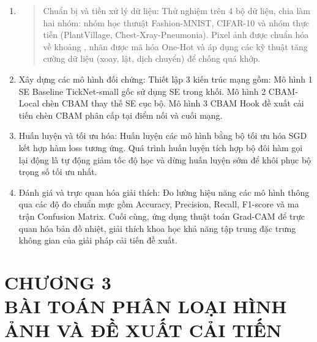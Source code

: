 \documentclass[
]{article}
\begin{document}
\begin{enumerate}
\def\labelenumi{\arabic{enumi}.}
\item
  \begin{quote}
  Chuẩn bị và tiền xử lý dữ liệu: Thử nghiệm trên 4 bộ dữ liệu, chia làm
  hai nhóm: nhóm học thưuật Fashion-MNIST, CIFAR-10 và nhóm thực tiễn
  (PlantVillage, Chest-Xray-Pneumonia). Pixel ảnh được chuẩn hóa về
  khoảng , nhãn được mã hóa One-Hot và áp dụng các kỹ thuật tăng cường
  dữ liệu (xoay, lật, dịch chuyển) để chống quá khớp.
  \end{quote}
\item
  Xây dựng các mô hình đối chứng: Thiết lập 3 kiến trúc mạng gồm: Mô
  hình 1 SE Baseline TickNet-small gốc sử dụng SE trong khối. Mô hình 2
  CBAM-Local chèn CBAM thay thế SE cục bộ. Mô hình 3 CBAM Hook đề xuất
  cải tiến chèn CBAM phân cấp tại điểm nối và cuối mạng.
\item
  Huấn luyện và tối ưu hóa: Huấn luyện các mô hình bằng bộ tối ưu hóa
  SGD kết hợp hàm loss tương ứng. Quá trình huấn luyện tích hợp bộ đôi
  hàm gọi lại động là tự động giảm tốc độ học và dừng huấn luyện sớm để
  khôi phục bộ trọng số tối ưu nhất.
\item
  Đánh giá và trực quan hóa giải thích: Đo lường hiệu năng các mô hình
  thông qua các độ đo chuẩn mực gồm Accuracy, Precision, Recall,
  F1-score và ma trận Confusion Matrix. Cuối cùng, ứng dụng thuật toán
  Grad-CAM để trực quan hóa bản đồ nhiệt, giải thích khoa học khả năng
  tập trung đặc trưng không gian của giải pháp cải tiến đề xuất.
\end{enumerate}

\hypertarget{chux1b0ux1a1ng-3-buxe0i-touxe1n-phuxe2n-loux1ea1i-huxecnh-ux1ea3nh-vuxe0-ux111ux1ec1-xuux1ea5t-cux1ea3i-tiux1ebfn}{%
\section{\texorpdfstring{CHƯƠNG 3\\
BÀI TOÁN PHÂN LOẠI HÌNH ẢNH VÀ ĐỀ XUẤT CẢI
TIẾN}{CHƯƠNG 3 BÀI TOÁN PHÂN LOẠI HÌNH ẢNH VÀ ĐỀ XUẤT CẢI TIẾN}}\label{chux1b0ux1a1ng-3-buxe0i-touxe1n-phuxe2n-loux1ea1i-huxecnh-ux1ea3nh-vuxe0-ux111ux1ec1-xuux1ea5t-cux1ea3i-tiux1ebfn}}
\end{document}
